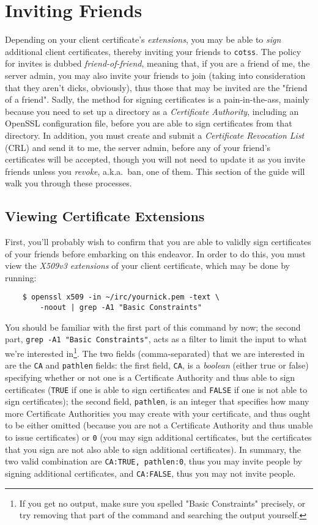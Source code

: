 \documentclass{article}
\begin{document}
{\section{Inviting Friends}
Depending on your client certificate's \textit{extensions}, you may be able to \textit{sign} additional client certificates, thereby inviting your friends to \texttt{cotss}.  The policy for invites is dubbed \textit{friend-of-friend}, meaning that, if you are a friend of me, the server admin, you may also invite your friends to join (taking into consideration that they aren't dicks, obviously), thus those that may be invited are the "friend of a friend".  Sadly, the method for signing certificates is a pain-in-the-ass, mainly because you need to set up a directory as a \textit{Certificate Authority}, including an OpenSSL configuration file, before you are able to sign certificates from that directory.  In addition, you must create and submit a \textit{Certificate Revocation List} (CRL) and send it to me, the server admin, before any of your friend's certificates will be accepted, though you will not need to update it as you invite friends unless you \textit{revoke}, a.k.a.\ ban, one of them.  This section of the guide will walk you through these processes.

\subsection{Viewing Certificate Extensions}
First, you'll probably wish to confirm that you are able to validly sign certificates of your friends before embarking on this endeavor.  In order to do this, you must view the \textit{X509v3 extensions} of your client certificate, which may be done by running:
\begin{lstlisting}
    $ openssl x509 -in ~/irc/yournick.pem -text \
        -noout | grep -A1 "Basic Constraints"
\end{lstlisting}
You should be familiar with the first part of this command by now; the second part, \texttt{grep -A1 "Basic Constraints"}, acts as a filter to limit the input to what we're interested in\footnote{If you get no output, make sure you spelled "Basic Constraints" precisely, or try removing that part of the command and searching the output yourself.}.  The two fields (comma-separated) that we are interested in are the \texttt{CA} and \texttt{pathlen} fields: the first field, \texttt{CA}, is a \textit{boolean} (either true or false) specifying whether or not one is a Certificate Authority and thus able to sign certificates (\texttt{TRUE} if one is able to sign certificates and \texttt{FALSE} if one is not able to sign certificates); the second field, \texttt{pathlen}, is an integer that specifies how many more Certificate Authorities you may create with your certificate, and thus ought to be either omitted (because you are not a Certificate Authority and thus unable to issue certificates) or \texttt{0} (you may sign additional certificates, but the certificates that you sign are not also able to sign additional certificates).  In summary, the two valid combination are \texttt{CA:TRUE, pathlen:0}, thus you may invite people by signing additional certificates, and \texttt{CA:FALSE}, thus you may not invite people.

}
\end{document}
